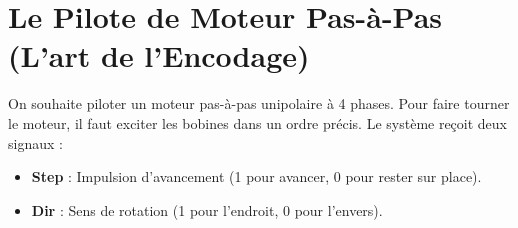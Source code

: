 \documentclass[a4paper,11pt]{article}
\newif\ifsolutions
\begin{document}
\ifsolutions
\begin{solbox}
\begin{enumerate}
\item \textbf{Diagramme :}
\begin{center}
\begin{tikzpicture}[node distance=3.5cm, auto]
  \node[state] (Off) {Off \\ \scriptsize Mag=0, Lamp=0};
  \node[state, right of=Off] (Run) {Run \\ \scriptsize Mag=1, Lamp=1};
  \node[state, below of=Run, yshift=-1cm] (Pause) {Pause \\ \scriptsize Mag=0, Lamp=1};

  \path[edge]
    (Off) edge node {Start / Door=1} (Run)
    (Run) edge node {Stop} (Pause)
    (Run) edge node[swap] {Door=0 / Mag=0} (Pause)
    (Pause) edge node {Start / Door=1} (Run)
    (Pause) edge node {Stop} (Off);
\end{tikzpicture}
\end{center}

\item \textbf{Lamp} ne dépend que de l'état (allumée dans \textit{Run} et \textit{Pause}, éteinte dans \textit{Off}). C'est une sortie de \textbf{Moore}.\\
\textbf{Mag} doit s'arrêter \textit{immédiatement} si la porte s'ouvre, sans attendre l'état suivant. C'est une sortie de \textbf{Mealy}. L'automate est donc \textbf{mixte}.

\item Si on traitait la porte comme un état (ex: un état \textit{Pause\_Porte\_Ouverte}), il y aurait un \textit{temps de latence} (le temps d'un cycle d'horloge) pendant lequel le magnétron serait encore actif alors que la porte est ouverte. En électronique numérique, une transition Mealy agit de manière \textit{asynchrone} par rapport à l'état (la sortie est combinatoire par rapport à l'entrée), ce qui coupe le magnétron en quelques nanosecondes.
\end{enumerate}
\end{solbox}
\fi

\newpage
\section{Le Pilote de Moteur Pas-à-Pas (L'art de l'Encodage)}
On souhaite piloter un moteur pas-à-pas unipolaire à 4 phases. Pour faire tourner le moteur, il faut exciter les bobines dans un ordre précis.
Le système reçoit deux signaux :
\begin{itemize}
\item \textbf{Step} : Impulsion d'avancement (1 pour avancer, 0 pour rester sur place).
\item \textbf{Dir} : Sens de rotation (1 pour l'endroit, 0 pour l'envers).
\end{itemize}
\end{document}
